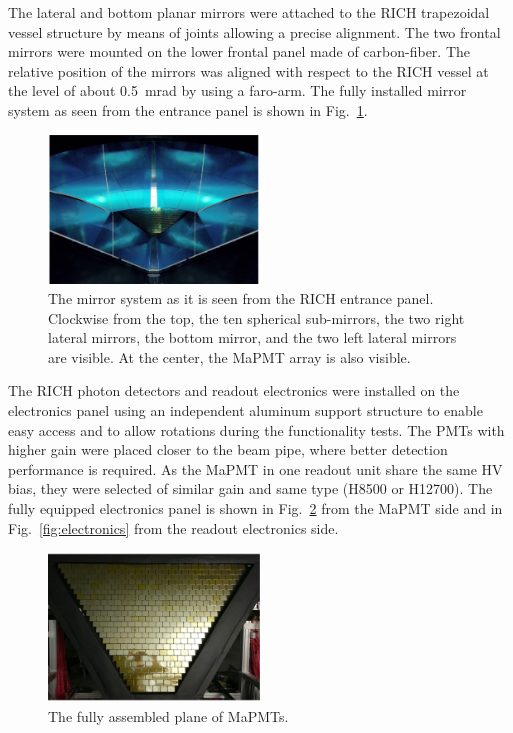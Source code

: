 \documentclass[5p,times,twocolumn]{elsarticle}
\def\MaPMT{MaPMT }
\begin{document}
The lateral and bottom planar mirrors were attached to the RICH trapezoidal vessel structure by means of
joints allowing a precise alignment. The two frontal mirrors
were mounted on the lower frontal panel made of carbon-fiber. The relative position of the mirrors was
aligned with respect to the RICH vessel at the level of about 0.5~mrad by using a faro-arm. The fully installed
mirror system as seen from the entrance panel is shown in Fig.~\ref{fig:mirrors}.

\begin{figure}
\begin{center}
\includegraphics[width=0.50\textwidth]{mirrors.pdf}
\caption{The mirror system as it is seen from the RICH entrance panel. Clockwise from the top, the ten spherical
  sub-mirrors, the two right lateral mirrors, the bottom mirror, and the two left lateral mirrors are visible. At the
  center, the MaPMT array is also visible.}
\label{fig:mirrors}
\end{center}
\end{figure}

The RICH photon detectors and readout electronics were installed on the electronics panel using an independent
aluminum support structure to enable easy access and to allow rotations during the functionality tests. The PMTs
with higher gain were placed closer to the beam pipe, where better detection performance is required. As the \MaPMT in
one readout unit share the same HV bias, they were selected of similar gain and same type (H8500 or H12700).
The fully equipped electronics panel is shown in Fig.~\ref{fig:MaPMTs} from the MaPMT side and in
Fig.~\ref{fig:electronics} from the readout electronics side.

\begin{figure}
\begin{center}
\includegraphics[width=0.50\textwidth]{MaPMT.pdf}
\caption{The fully assembled plane of MaPMTs.}
\label{fig:MaPMTs}
\end{center}
\end{figure}
\end{document}
